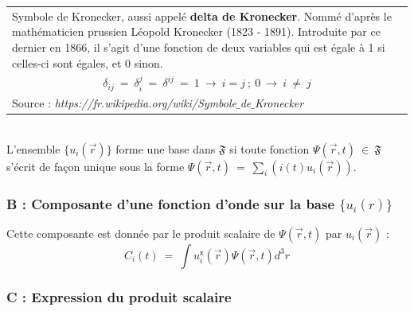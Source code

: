 \documentclass[12pt,a4paper,titlepage]{book}
\begin{document}
\begin{tabular}{|p{15cm}|}
\hline
Symbole de Kronecker, aussi appelé \textbf{delta de Kronecker}. Nommé d'après le mathématicien prussien Léopold Kronecker (1823 - 1891). Introduite par ce dernier en 1866, il s'agit d'une fonction de deux variables qui est égale à 1 si celles-ci sont égales, et 0 sinon.\\
\begin{equation*}
\delta_{ij} ~=~ \delta_i^j ~=~ \delta^{ij} ~=~ 1 ~\rightarrow~ i = j ~;~ 0 ~\rightarrow~ i ~\neq~ j
\end{equation*}\\

Source : \textit{https://fr.wikipedia.org/wiki/Symbole$\_$de$\_$Kronecker}\\
\hline
\end{tabular}\\

L'ensemble $\lbrace u_i (\overrightarrow{r}) \rbrace$ forme une base dans $\mathfrak{F}$ si toute fonction $\Psi (\overrightarrow{r}, t) ~\in~ \mathfrak{F}$ s'écrit de façon unique sous la forme $\Psi (\overrightarrow{r}, t) ~=~ \sum\limits_{i} (i(t)u_i(\overrightarrow{r}))$.

\subsubsection{B : Composante d'une fonction d'onde sur la base $\lbrace u_i (r) \rbrace$}

Cette composante est donnée par le produit scalaire de $\Psi (\overrightarrow{r}, t)$ par $u_i (\overrightarrow{r})$ :\\
\begin{equation*}
C_i (t) ~=~ \int u_i^{\mathsf{x}} (\overrightarrow{r}) \Psi (\overrightarrow{r}, t) d^3 r
\end{equation*}

\subsubsection{C : Expression du produit scalaire}
\end{document}
